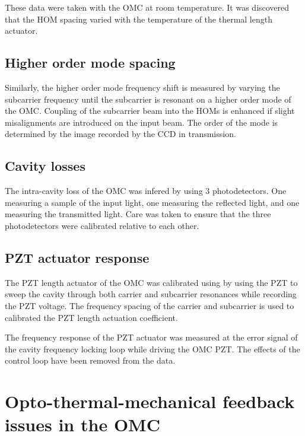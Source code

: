 These data were taken with the OMC at room temperature. %
It was discovered that the HOM spacing varied with the temperature of the thermal length actuator. %

\subsection{Higher order mode spacing}
Similarly, the higher order mode frequency shift is measured by varying the subcarrier frequency until the subcarrier is resonant on a higher order mode of the OMC. %
Coupling of the subcarrier beam into the HOMs is enhanced if slight misalignments are introduced on the input beam. %
The order of the mode is determined by the image recorded by the CCD in transmission.

\subsection{Cavity losses}
The intra-cavity loss of the OMC was infered by using 3 photodetectors. %
One measuring a sample of the input light, one measuring the reflected light, and one measuring the transmitted light. %
Care was taken to ensure that the three photodetectors were calibrated relative to each other.



\subsection{PZT actuator response}
The PZT length actuator of the OMC was calibrated using by using the PZT to sweep the cavity through both carrier and subcarrier resonances while recording the PZT voltage. %
The frequency spacing of the carrier and subcarrier is used to calibrated the PZT length actuation coefficient.


The frequency response of the PZT actuator was measured at the error signal of the cavity frequency locking loop while driving the OMC PZT. %
The effects of the control loop have been removed from the data.


\section{Opto-thermal-mechanical feedback issues in the OMC}


